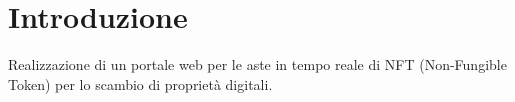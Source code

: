 \section{Introduzione}
Realizzazione di un portale web per le aste in tempo reale di NFT (Non-Fungible Token) per lo scambio di proprietà digitali.